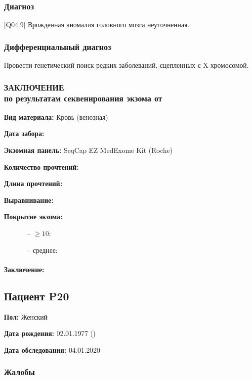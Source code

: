 \documentclass[a4paper,14pt]{extarticle}
\newcommand{\mln}{млн}
\newcommand{\DS}[2]{[#2] #1}
\begin{document}
\subsubsection*{Диагноз}

\DS{Врожденная аномалия головного мозга неуточненная}{Q04.9}.

\subsubsection*{Дифференциальный диагноз}

Провести генетический поиск редких заболеваний, сцепленных с X\hyp{}хромосомой.

\subsubsection*{ЗАКЛЮЧЕНИЕ\\по результатам секвенирования экзома от }

\textbf{Вид материала:} Кровь (венозная)

\textbf{Дата забора:} 

\textbf{Экзомная панель:} SeqCap EZ MedExome Kit (Roche)

\textbf{Количество прочтений:} \numprint[\mln]{5}

\textbf{Длина прочтений:} 

\textbf{Выравнивание:} 

\textbf{Покрытие экзома:}

~~~~~~ -- $\geqslant10$: 

~~~~~~ -- среднее: 





\paragraph{Заключение:}

\newpage
\subsection*{Пациент P20}

\textbf{Пол:} Женский

\textbf{Дата рождения:} 02.01.1977 ()

\textbf{Дата обследования:} 04.01.2020

\subsubsection*{Жалобы}
\end{document}
